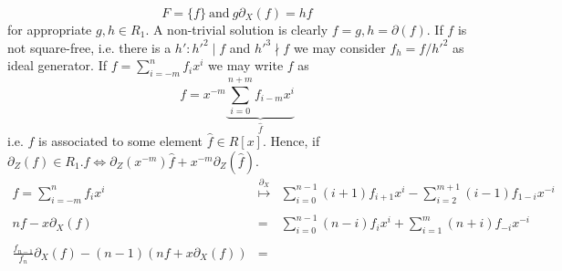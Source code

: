 \documentclass[10pt,a4paper]{article}
\begin{document}
$$F = \{f\}\ \mathrm{and}\ g \partial_X(f) = h f$$
for appropriate $g, h \in R_1$. A non-trivial solution is clearly $f = g, h = \partial(f)$. If $f$ is not square-free, i.e. there is a $h': h'^2\mid f$ and $h'^3\nmid f$ we may consider $f_h = f/h'^2$ as ideal generator. If $f = \sum_{i=-m}^n f_i x^i$ we may write $f$ as
$$f = x^{-m} \underbrace{\sum_{i=0}^{n+m} f_{i-m} x^i}_{\hat{f}}$$
i.e. $f$ is associated to some element $\hat{f} \in R[x]$. Hence, if $\partial_Z(f) \in R_1.f \Leftrightarrow \partial_Z(x^{-m}) \hat{f} + x^{-m} \partial_Z(\hat{f})$.
$$\begin{array}{rcl}
f = \sum_{i=-m}^n f_i x^i &\stackrel{\partial_X}{\longmapsto}& \sum_{i=0}^{n-1} (i + 1) f_{i+1} x^i - \sum_{i=2}^{m + 1} (i - 1) f_{1 - i} x^{-i}\\
&&\\
n f - x \partial_X(f) &=& \sum_{i=0}^{n-1} (n - i) f_i x^i + \sum_{i=1}^m (n + i) f_{-i} x^{-i}\\
&&\\
\frac{f_{n-1}}{f_n} \partial_X(f) - (n - 1) (n f + x \partial_X(f)) &=& 
\end{array}$$
\end{document}
